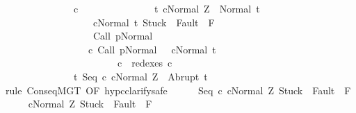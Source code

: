 \begin{isabellebody}
\ \ \ \ \ \ \ \ \ \ \ \ \ \ \ c{}\isanewline
\ \ \ \ \ \ \ \ \ \ \ \ \ \ \ {\isacharbraceleft}t{\isachardot}\ {\isasymGamma}{\isasymturnstile}{\isasymlangle}c{}{\isacharcomma}Normal\ Z{\isasymrangle}\ {\isasymRightarrow}\ Normal\ t\ {\isasymand}\ \isanewline
\ \ \ \ \ \ \ \ \ \ \ \ \ \ \ \ \ \ \ {\isasymGamma}{\isasymturnstile}{\isasymlangle}c{}{\isacharcomma}Normal\ t{\isasymrangle}\ {\isasymRightarrow}{\isasymnotin}{\isacharparenleft}{\isacharbraceleft}Stuck{\isacharbraceright}\ {\isasymunion}\ Fault\ {\isacharbackquote}\ {\isacharparenleft}{\isacharminus}F{\isacharparenright}{\isacharparenright}\ {\isasymand}\ \isanewline
\ \ \ \ \ \ \ \ \ \ \ \ \ \ \ \ \ \ \ {\isasymGamma}{\isasymturnstile}Call\ p{\isasymdown}Normal\ {\isasymsigma}\ {\isasymand}\isanewline
\ \ \ \ \ \ \ \ \ \ \ \ \ \ \ \ \ \ {\isacharparenleft}{\isasymexists}c{\isacharprime}{\isachardot}\ {\isasymGamma}{\isasymturnstile}{\isacharparenleft}Call\ p{\isacharcomma}Normal\ {\isasymsigma}{\isacharparenright}\ {\isasymrightarrow}\isactrlsup {\isacharplus}\ {\isacharparenleft}c{\isacharprime}{\isacharcomma}Normal\ t{\isacharparenright}\ {\isasymand}\ \isanewline
\ \ \ \ \ \ \ \ \ \ \ \ \ \ \ \ \ \ \ \ \ \ \ \ c{}\ {\isasymin}\ redexes\ c{\isacharprime}{\isacharparenright}{\isacharbraceright}{\isacharcomma}\isanewline
\ \ \ \ \ \ \ \ \ \ \ \ \ \ \ {\isacharbraceleft}t{\isachardot}\ {\isasymGamma}{\isasymturnstile}{\isasymlangle}Seq\ c{}\ c{}{\isacharcomma}Normal\ Z{\isasymrangle}\ {\isasymRightarrow}\ Abrupt\ t{\isacharbraceright}{\isachardoublequoteclose}\isanewline
\ \ \isamarkupfalse%
\ {\isacharparenleft}rule\ ConseqMGT\ {\isacharbrackleft}OF\ hyp{\isacharunderscore}c{}{\isacharbrackright}{\isacharcomma}clarify{\isacharcomma}safe{\isacharparenright}\isanewline
\ \ \ \ \isamarkupfalse%
\ {\isachardoublequoteopen}{\isasymGamma}{\isasymturnstile}{\isasymlangle}Seq\ c{}\ c{}{\isacharcomma}Normal\ Z{\isasymrangle}\ {\isasymRightarrow}{\isasymnotin}{\isacharparenleft}{\isacharbraceleft}Stuck{\isacharbraceright}\ {\isasymunion}\ Fault\ {\isacharbackquote}\ {\isacharparenleft}{\isacharminus}F{\isacharparenright}{\isacharparenright}{\isachardoublequoteclose}\isanewline
\ \ \ \ \isamarkupfalse%
\ {\isachardoublequoteopen}{\isasymGamma}{\isasymturnstile}{\isasymlangle}c{}{\isacharcomma}Normal\ Z{\isasymrangle}\ {\isasymRightarrow}{\isasymnotin}{\isacharparenleft}{\isacharbraceleft}Stuck{\isacharbraceright}\ {\isasymunion}\ Fault\ {\isacharbackquote}\ {\isacharparenleft}{\isacharminus}F{\isacharparenright}{\isacharparenright}{\isachardoublequoteclose}\ \isanewline

\end{isabellebody}
